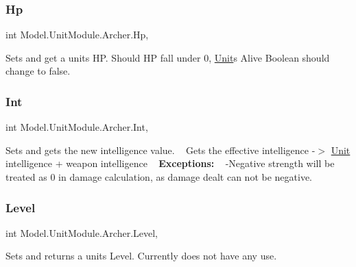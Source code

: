 \subsubsection{\texorpdfstring{Hp}{Hp}}
{\footnotesize\ttfamily int Model.\+Unit\+Module.\+Archer.\+Hp\hspace{0.3cm}{\ttfamily [get]}, {\ttfamily [set]}}

Sets and get a unit\textquotesingle{}s HP. Should HP fall under 0, \hyperlink{interface_model_1_1_unit_module_1_1_unit}{Unit}\textquotesingle{}s Alive Boolean should change to false. \hypertarget{class_model_1_1_unit_module_1_1_archer_ae003038905be807ec42d56ac979b1369}{}\label{class_model_1_1_unit_module_1_1_archer_ae003038905be807ec42d56ac979b1369} 
\subsubsection{\texorpdfstring{Int}{Int}}
{\footnotesize\ttfamily int Model.\+Unit\+Module.\+Archer.\+Int\hspace{0.3cm}{\ttfamily [get]}, {\ttfamily [set]}}

Sets and gets the new intelligence value. ~\newline
 Gets the effective intelligence -\/$>$ \hyperlink{interface_model_1_1_unit_module_1_1_unit}{Unit} intelligence + weapon intelligence ~\newline
 {\bfseries Exceptions\+:} ~\newline
 -\/\+Negative strength will be treated as 0 in damage calculation, as damage dealt can not be negative. \hypertarget{class_model_1_1_unit_module_1_1_archer_a8f0956dcf4b5053754652649e72655e2}{}\label{class_model_1_1_unit_module_1_1_archer_a8f0956dcf4b5053754652649e72655e2} 
\subsubsection{\texorpdfstring{Level}{Level}}
{\footnotesize\ttfamily int Model.\+Unit\+Module.\+Archer.\+Level\hspace{0.3cm}{\ttfamily [get]}, {\ttfamily [set]}}

Sets and returns a unit\textquotesingle{}s Level. Currently does not have any use. \hypertarget{class_model_1_1_unit_module_1_1_archer_abe69c6c957abd5c25c7c52576faa015c}{}\label{class_model_1_1_unit_module_1_1_archer_abe69c6c957abd5c25c7c52576faa015c} 
